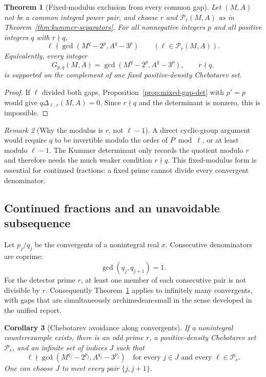 \documentclass[11pt,oneside]{article}
\newtheorem{theorem}{Theorem}[section]
\newtheorem{corollary}[theorem]{Corollary}
\theoremstyle{definition}
\theoremstyle{remark}
\newtheorem{remark}[theorem]{Remark}
\begin{document}
\begin{theorem}[Fixed-modulus exclusion from every common gap]
\label{thm:gap-exclusion}
Let $(M,A)$ not be a common integral power pair, and choose $r$ and
$\mathcal P_r(M,A)$ as in Theorem~\ref{thm:kummer-separators}.  For all nonnegative integers
$p$ and all positive integers $q$ with $r\nmid q$,
\begin{equation}
 \ell\nmid \gcd(M^q-2^p,A^q-3^p)
 \qquad(\ell\in\mathcal P_r(M,A)).
 \label{eq:gap-exclusion}
\end{equation}
Equivalently, every integer
\[
 G_{p,q}(M,A)=\gcd(M^q-2^p,A^q-3^p),\qquad r\nmid q,
\]
is supported on the complement of one fixed positive-density Chebotarev set.
\end{theorem}

\begin{proof}
If $\ell$ divided both gaps, Proposition~\ref{prop:mixed-gap-det} with $p'=p$ would give
$q\Delta_{\ell,r}(M,A)=0$.  Since $r\nmid q$ and the determinant is nonzero, this is
impossible.
\end{proof}

\begin{remark}[Why the modulus is $r$, not $\ell-1$]
A direct cyclic-group argument would require $q$ to be invertible modulo the order of
$P\bmod\ell$, or at least modulo $\ell-1$.  The Kummer determinant only records the quotient
modulo $r$ and therefore needs the much weaker condition $r\nmid q$.  This fixed-modulus form
is essential for continued fractions: a fixed prime cannot divide every convergent
denominator.
\end{remark}

\subsection{Continued fractions and an unavoidable subsequence}

Let $p_j/q_j$ be the convergents of a nonintegral real $x$.  Consecutive denominators are
coprime:
\[
 \gcd(q_j,q_{j+1})=1.
\]
For the detector prime $r$, at least one member of each consecutive pair is not divisible by
$r$.  Consequently Theorem~\ref{thm:gap-exclusion} applies to infinitely many convergents,
with gaps that are simultaneously archimedean-small in the sense developed in the unified
report.

\begin{corollary}[Chebotarev avoidance along convergents]
\label{cor:convergent-avoidance}
If a nonintegral counterexample exists, there is an odd prime $r$, a positive-density
Chebotarev set $\mathcal P_r$, and an infinite set of indices $J$ such that
\begin{equation}
 \ell\nmid
 \gcd(M^{q_j}-2^{p_j},A^{q_j}-3^{p_j})
 \quad\text{for every }j\in J\text{ and every }\ell\in\mathcal P_r.
 \label{eq:convergent-exclusion}
\end{equation}
One can choose $J$ to meet every pair $\{j,j+1\}$.
\end{corollary}
\end{document}
